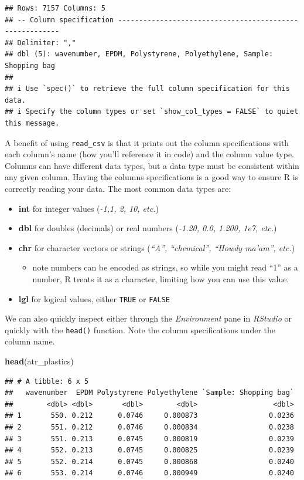 \documentclass[
]{book}
\newenvironment{Shaded}{\begin{snugshade}}{\end{snugshade}}
\newcommand{\FunctionTok}[1]{\textcolor[rgb]{0.13,0.29,0.53}{\textbf{#1}}}
\newcommand{\NormalTok}[1]{#1}
\providecommand{\tightlist}{%
  \setlength{\itemsep}{0pt}\setlength{\parskip}{0pt}}
\begin{document}
\begin{verbatim}
## Rows: 7157 Columns: 5
## -- Column specification --------------------------------------------------------
## Delimiter: ","
## dbl (5): wavenumber, EPDM, Polystyrene, Polyethylene, Sample: Shopping bag
## 
## i Use `spec()` to retrieve the full column specification for this data.
## i Specify the column types or set `show_col_types = FALSE` to quiet this message.
\end{verbatim}

A benefit of using \texttt{read\_csv} is that it prints out the column specifications with each column's name (how you'll reference it in code) and the column value type. Columns can have different data types, but a data type must be consistent within any given column. Having the columns specifications is a good way to ensure R is correctly reading your data. The most common data types are:

\begin{itemize}
\tightlist
\item
  \textbf{int} for integer values (\emph{-1,1, 2, 10, etc.})
\item
  \textbf{dbl} for doubles (decimals) or real numbers (\emph{-1.20, 0.0, 1.200, 1e7, etc.})
\item
  \textbf{chr} for character vectors or strings (\emph{``A'', ``chemical'', ``Howdy ma'am'', etc.})

  \begin{itemize}
  \tightlist
  \item
    note numbers can be encoded as strings, so while you might read ``1'' as a number, R treats it as a character, limiting how you can use this value.
  \end{itemize}
\item
  \textbf{lgl} for logical values, either \texttt{TRUE} or \texttt{FALSE}
\end{itemize}

We can also quickly inspect either through the \emph{Environment} pane in \emph{RStudio} or quickly with the \texttt{head()} function. Note the column specifications under the column name.

\begin{Shaded}
\begin{Highlighting}[]
\FunctionTok{head}\NormalTok{(atr\_plastics)}
\end{Highlighting}
\end{Shaded}

\begin{verbatim}
## # A tibble: 6 x 5
##   wavenumber  EPDM Polystyrene Polyethylene `Sample: Shopping bag`
##        <dbl> <dbl>       <dbl>        <dbl>                  <dbl>
## 1       550. 0.212      0.0746     0.000873                 0.0236
## 2       551. 0.212      0.0746     0.000834                 0.0238
## 3       551. 0.213      0.0745     0.000819                 0.0239
## 4       552. 0.213      0.0745     0.000825                 0.0239
## 5       552. 0.214      0.0745     0.000868                 0.0240
## 6       553. 0.214      0.0746     0.000949                 0.0240
\end{verbatim}
\end{document}
